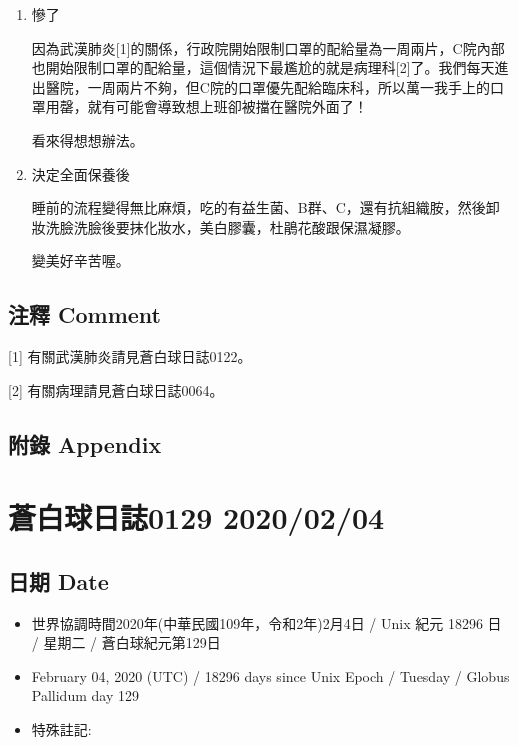 \documentclass[
]{article}
\providecommand{\tightlist}{%
  \setlength{\itemsep}{0pt}\setlength{\parskip}{0pt}}
\begin{document}
\begin{enumerate}
\def\labelenumi{\arabic{enumi}.}
\item
  慘了

  因為武漢肺炎{[}1{]}的關係，行政院開始限制口罩的配給量為一周兩片，C院內部也開始限制口罩的配給量，這個情況下最尷尬的就是病理科{[}2{]}了。我們每天進出醫院，一周兩片不夠，但C院的口罩優先配給臨床科，所以萬一我手上的口罩用罄，就有可能會導致想上班卻被擋在醫院外面了！

  看來得想想辦法。
\item
  決定全面保養後

  睡前的流程變得無比麻煩，吃的有益生菌、B群、C，還有抗組織胺，然後卸妝洗臉洗臉後要抹化妝水，美白膠囊，杜鵑花酸跟保濕凝膠。

  變美好辛苦喔。
\end{enumerate}

\hypertarget{ux6ce8ux91cb-comment-63}{%
\subsection{注釋 Comment}\label{ux6ce8ux91cb-comment-63}}

{[}1{]} 有關武漢肺炎請見蒼白球日誌0122。

{[}2{]} 有關病理請見蒼白球日誌0064。

\hypertarget{ux9644ux9304-appendix-64}{%
\subsection{附錄 Appendix}\label{ux9644ux9304-appendix-64}}

\hypertarget{ux84bcux767dux7403ux65e5ux8a8c0129-20200204}{%
\section{蒼白球日誌0129
2020/02/04}\label{ux84bcux767dux7403ux65e5ux8a8c0129-20200204}}

\hypertarget{ux65e5ux671f-date-65}{%
\subsection{日期 Date}\label{ux65e5ux671f-date-65}}

\begin{itemize}
\tightlist
\item
  世界協調時間2020年(中華民國109年，令和2年)2月4日 / Unix 紀元 18296 日
  / 星期二 / 蒼白球紀元第129日
\item
  February 04, 2020 (UTC) / 18296 days since Unix Epoch / Tuesday /
  Globus Pallidum day 129
\item
  特殊註記:
\end{itemize}
\end{document}
